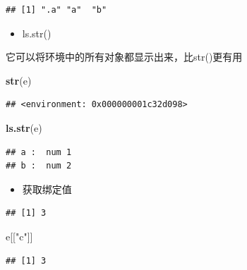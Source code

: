\documentclass[]{book}
\newenvironment{Shaded}{\begin{snugshade}}{\end{snugshade}}
\newcommand{\KeywordTok}[1]{\textcolor[rgb]{0.13,0.29,0.53}{\textbf{#1}}}
\newcommand{\DecValTok}[1]{\textcolor[rgb]{0.00,0.00,0.81}{#1}}
\newcommand{\StringTok}[1]{\textcolor[rgb]{0.31,0.60,0.02}{#1}}
\newcommand{\OperatorTok}[1]{\textcolor[rgb]{0.81,0.36,0.00}{\textbf{#1}}}
\newcommand{\NormalTok}[1]{#1}
\providecommand{\tightlist}{%
  \setlength{\itemsep}{0pt}\setlength{\parskip}{0pt}}
\begin{document}
\begin{verbatim}
## [1] ".a" "a"  "b"
\end{verbatim}

\begin{itemize}
\tightlist
\item
  ls.str()
\end{itemize}

它可以将环境中的所有对象都显示出来，比str()更有用

\begin{Shaded}
\begin{Highlighting}[]
\KeywordTok{str}\NormalTok{(e)}
\end{Highlighting}
\end{Shaded}

\begin{verbatim}
## <environment: 0x000000001c32d098>
\end{verbatim}

\begin{Shaded}
\begin{Highlighting}[]
\KeywordTok{ls.str}\NormalTok{(e)}
\end{Highlighting}
\end{Shaded}

\begin{verbatim}
## a :  num 1
## b :  num 2
\end{verbatim}

\begin{itemize}
\tightlist
\item
  获取绑定值
\end{itemize}

\begin{Shaded}
\end{Shaded}

\begin{verbatim}
## [1] 3
\end{verbatim}

\begin{Shaded}
\begin{Highlighting}[]
\NormalTok{e[[}\StringTok{"c"}\NormalTok{]]}
\end{Highlighting}
\end{Shaded}

\begin{verbatim}
## [1] 3
\end{verbatim}
\end{document}
